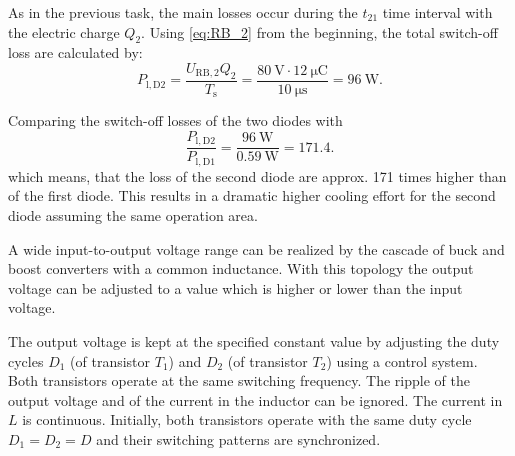 \begin{solutionblock}
    As in the previous task, the main losses occur during the $t_{21}$ time interval with the electric charge $Q_{2}$. Using \eqref{eq:RB_2} from the beginning, the total switch-off loss are calculated by:
    \begin{equation}
        P_{\mathrm{l,D2}} = \frac{U_{\mathrm{RB,2}}Q_2}{T_{\mathrm{s}}}
        = \frac{\SI{80}{\volt}\cdot\SI{12}{\micro\coulomb}}{\SI{10}{\micro\second}} = \SI{96}{\watt}.
    \end{equation}

    Comparing the switch-off losses of the two diodes with
    \begin{equation}
        \frac{P_{\mathrm{l,D2}}}{P_{\mathrm{l,D1}}} = \frac{\SI{96}{\watt}}{\SI{0.59}{\watt}} = 171.4.
    \end{equation}
    which means, that the loss of the second diode are approx. 171 times higher than of the first diode. This results in a dramatic higher cooling effort for the second diode assuming the same operation area.

\end{solutionblock}




A wide input-to-output voltage range can be realized by the cascade of buck and boost converters with a common inductance.
With this topology the output voltage can be adjusted to a value which is higher or lower than the input voltage.
\par

\par


The output voltage is kept at the specified constant value by adjusting the duty cycles $D_1$ 
(of transistor  $T_1$) and $D_2$ (of transistor $T_2$) using a control system. Both transistors operate at the same switching frequency.
The ripple of the output voltage and of the current in the inductor can be ignored. The current in $L$ is continuous.
Initially, both transistors operate with the same duty cycle $D_1 = D_2 = D$ and their switching patterns are synchronized.



